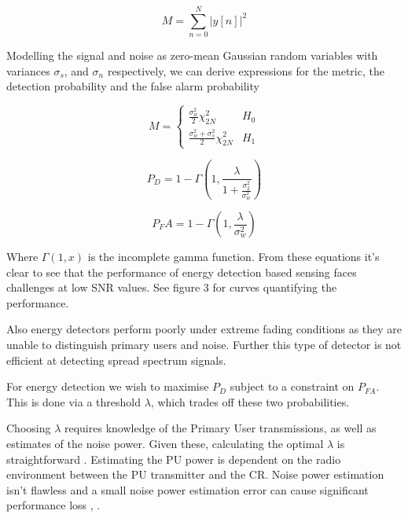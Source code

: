 \begin{equation}
M = \sum_{n=0}^N |y\left[n\right]|^2
\end{equation}

Modelling the signal and noise as zero-mean Gaussian random variables with variances \(\sigma_s\), and \(\sigma_n\) respectively, we can derive expressions for the metric, the detection probability and the false alarm probability \cite{yucek2009survey}

\begin{equation}
 M =
  \begin{cases}
   \frac{\sigma_w^2}{2} \chi^2_{2N} & H_0 \\
   \frac{\sigma_w^2 + \sigma_s^2}{2} \chi^2_{2N} & H_1
  \end{cases}
\end{equation}

\begin{equation}
P_D = 1 - \Gamma\left(1, \frac{\lambda}{1 + \frac{ \sigma_2^2 }{ \sigma_w^2 } } \right)
\end{equation}

\begin{equation}
P_FA = 1 - \Gamma\left(1, \frac{\lambda}{\sigma_w^2} \right)
\end{equation}

Where \( \Gamma\left(1,x\right)\) is the incomplete gamma function. From these equations it's clear to see that the performance of energy detection based sensing faces challenges at low SNR values. See \cite{yucek2009survey} figure 3 for curves quantifying the performance. 

Also energy detectors perform poorly under extreme fading conditions as they are unable to distinguish primary users and noise. Further this type of detector is not efficient at detecting spread spectrum signals. 

For energy detection we wish to maximise \(P_D\) subject to a constraint on \(P_{FA}\). This is done via a threshold \(\lambda\), which trades off these two probabilities.

Choosing \(\lambda\) requires knowledge of the Primary User transmissions, as well as estimates of the noise power. Given these, calculating the optimal \(\lambda\) is straightforward \cite{xie2009optimal}. Estimating the PU power is dependent on the radio environment between the PU transmitter and the CR. Noise power estimation isn't flawless and a small noise power estimation error can cause significant performance loss \cite{hamdi2010impact}, \cite{sahai2004some}.

